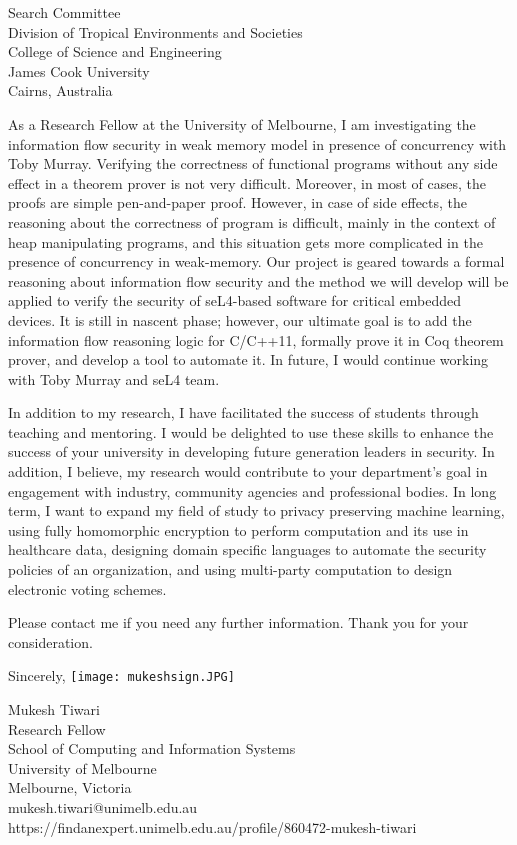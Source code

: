 \documentclass{letter}
\begin{document}
\begin{letter}{Search Committee\\
Division of Tropical Environments and Societies\\
College of Science and Engineering\\
James Cook University\\
Cairns, Australia}
 
As a Research Fellow at the University of Melbourne, I am investigating the 
information flow security in weak memory model in presence of concurrency with Toby Murray. 
Verifying the correctness of functional programs without any side effect in a theorem prover 
is not very difficult. Moreover, in most of cases, the proofs are simple pen-and-paper proof. 
However, in case of side effects, the reasoning about the correctness of program is
difficult, mainly in the context of heap manipulating programs, and this situation gets 
more complicated in the presence of concurrency in weak-memory. Our project is geared 
towards a formal reasoning about information flow security and 
the method we will develop will be applied to verify the security of seL4-based 
software for critical embedded devices. It is still in nascent phase; however, our 
ultimate goal is to add the  information flow reasoning logic for C/C++11, formally 
prove it in Coq theorem prover, and develop a tool to automate it. In future, I would 
continue working with Toby Murray and seL4 team.   


In addition to my research, I have facilitated the success of students through teaching and mentoring.  
I would be delighted to use these skills to enhance the success of your university in developing  
future generation leaders in security. In addition, I believe, my research would contribute to 
your department's goal in engagement with industry, community agencies and
professional bodies.  In long term, I want to expand my field of study to privacy preserving 
machine learning,  using fully homomorphic encryption to perform computation and its 
use in healthcare data, designing domain specific languages to automate the security policies 
of an organization, and using multi-party computation to design electronic voting schemes. 


Please contact me if you need any further information. 
Thank you for your consideration.


\closing{Sincerely,
\texttt{[image: mukeshsign.JPG]}
}

Mukesh Tiwari\\
Research Fellow \\
School of Computing and Information Systems\\
University of Melbourne\\
Melbourne, Victoria\\
mukesh.tiwari@unimelb.edu.au\\
https://findanexpert.unimelb.edu.au/profile/860472-mukesh-tiwari\\

\end{letter}
\end{document}
